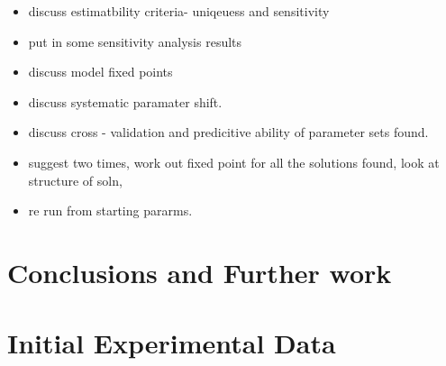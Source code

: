 \documentclass[10pt,journal]{./IEEE_latex_class/IEEEtran}
\begin{document}
\clearpage

 
 \begin{itemize}
 \item discuss estimatbility criteria- uniqeuess and sensitivity
 \item put in some sensitivity analysis results
 \item discuss model fixed points
 \item discuss systematic paramater shift.
 \item discuss cross - validation and predicitive ability of parameter sets found.
 \item suggest two times, work out fixed point for all the solutions found, look at structure of soln,
 \item re run from starting pararms.
 \end{itemize}
 
 

\section{Conclusions and Further work}
\label{Conclusions and Further work}





\clearpage
\onecolumn

\appendices
\renewcommand\thefigure{\thesection.\arabic{figure}}  


\section{Initial Experimental Data}
\label{Initial Experimental Data}
\setcounter{figure}{0}    
\end{document}
